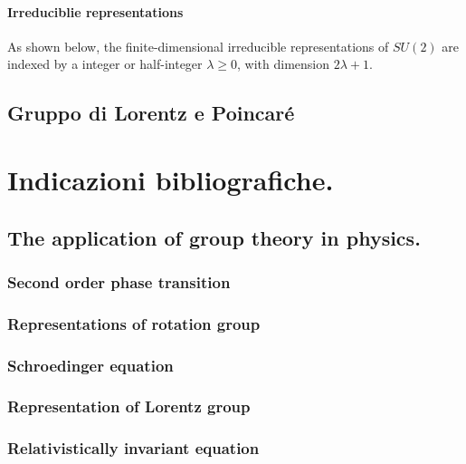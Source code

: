 \documentclass[oneside,12pt]{memoir}
\begin{document}
\subsection{Irreduciblie representations}

As shown below, the finite-dimensional irreducible representations of $SU(2)$ are indexed by a integer or half-integer $\lambda \geq 0$, with dimension $2\lambda+1$.



\chapter{Gruppo di Lorentz e Poincar\'e}
\PartialToc





\part{Indicazioni bibliografiche.}


\chapter{The application of group theory in physics.}
\PartialToc


\section{Second order phase transition}

\section{Representations of rotation group}

\section{\texorpdfstring{Schr\:oedinger}{Schroedinger} equation}

\section{Representation of Lorentz group}

\section{Relativistically invariant equation}
\end{document}
